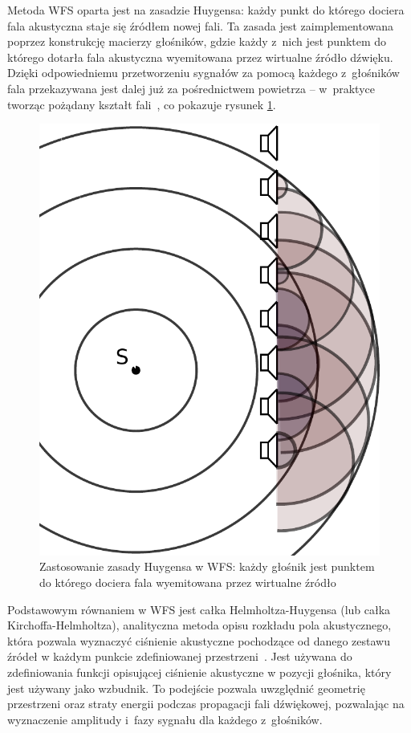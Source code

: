 \documentclass[12pt]{oska}
\begin{document}
Metoda WFS oparta jest na zasadzie Huygensa: każdy punkt
do którego dociera fala akustyczna staje się źródłem nowej fali. Ta zasada
jest zaimplementowana poprzez konstrukcję macierzy głośników, gdzie każdy z~nich
jest punktem do którego dotarła fala akustyczna wyemitowana przez wirtualne
źródło dźwięku. Dzięki odpowiedniemu przetworzeniu sygnałów za pomocą każdego z~głośników fala przekazywana jest dalej już za pośrednictwem powietrza -- w~praktyce tworząc pożądany kształt fali~\cite{hq_rendering}, co pokazuje rysunek
\ref{r:Huygens}.

\begin{figure}[!tbh]
  \centering
  \includegraphics[scale=.4]{vecgraphics/WFS_idea.pdf}
  \caption{Zastosowanie zasady Huygensa w WFS: każdy głośnik jest punktem do
    którego dociera fala wyemitowana przez wirtualne źródło}
  \label{r:Huygens}
\end{figure}

Podstawowym równaniem w WFS jest całka Helmholtza-Huygensa (lub całka
Kirchoffa-Helmholtza), analityczna metoda opisu rozkładu pola
akustycznego, która pozwala wyznaczyć ciśnienie akustyczne pochodzące od danego zestawu
źródeł w każdym punkcie zdefiniowanej przestrzeni~\cite{snaka}. Jest używana do
zdefiniowania funkcji opisującej ciśnienie akustyczne w pozycji głośnika, który
jest używany jako wzbudnik. To podejście pozwala uwzględnić geometrię
przestrzeni oraz straty energii podczas propagacji fali dźwiękowej, pozwalając na wyznaczenie amplitudy i~fazy sygnału dla każdego z~głośników. 
\end{document}

